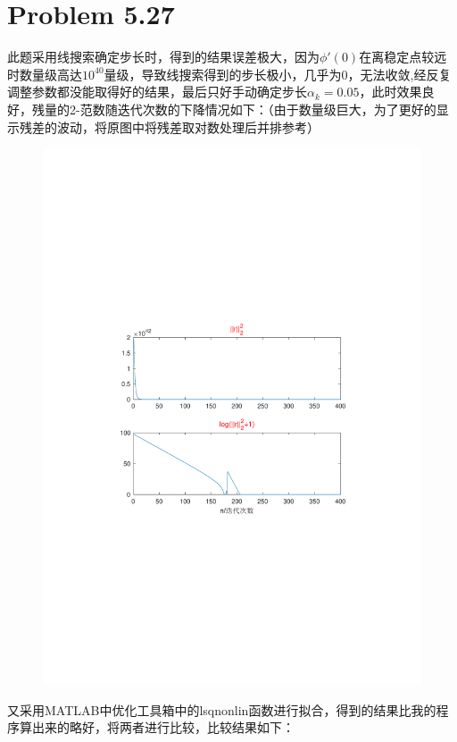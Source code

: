 \newpage

\section{Problem 5.27}

此题采用线搜索确定步长时，得到的结果误差极大，因为$\phi'(0)$在离稳定点较远时数量级高达$10^{40}$量级，导致线搜索得到的步长极小，几乎为0，无法收敛,经反复调整参数都没能取得好的结果，最后只好手动确定步长$\alpha_k=0.05$，此时效果良好，残量的2-范数随迭代次数的下降情况如下：（由于数量级巨大，为了更好的显示残差的波动，将原图中将残差取对数处理后并排参考）

\begin{figure}[H]
\centering
\includegraphics[width=12cm]{fig/6_1.pdf}
\end{figure}



又采用MATLAB中优化工具箱中的lsqnonlin函数进行拟合，得到的结果比我的程序算出来的略好，将两者进行比较，比较结果如下：

